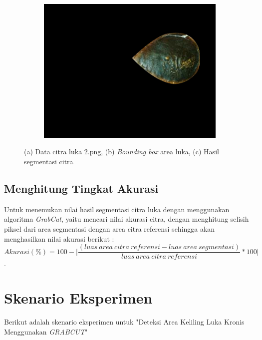 \begin{figure}[H]
\begin{subfigure}{0.3\textwidth}
		\includegraphics[width=\textwidth]{gambar/res_2.png}
		\caption{}
	  \end{subfigure}
	\caption{
		(a) Data citra luka 2.png, (b) \emph{Bounding box} area luka, (c) Hasil segmentasi citra
	 }
  \end{figure}

\subsection{Menghitung Tingkat Akurasi}
Untuk menemukan nilai hasil segmentasi citra luka dengan menggunakan algoritma \emph{GrabCut},
yaitu mencari nilai akurasi citra, dengan menghitung selisih piksel dari area
segmentasi dengan area citra referensi sehingga akan menghasilkan nilai akurasi berikut :
\begin{equation} \label{eq:validasi}
	Akurasi(\%) = 100 - \bigg | \frac{(luas \: area \: citra \: referensi - luas \: area \: segmentasi)}{luas \: area \: citra \: referensi} * 100 \bigg |
\end{equation}.


\section{Skenario Eksperimen} \label{section:skenario_eksperimen}

Berikut adalah skenario eksperimen untuk "Deteksi Area Keliling Luka Kronis 
Menggunakan \emph{GRABCUT}"

